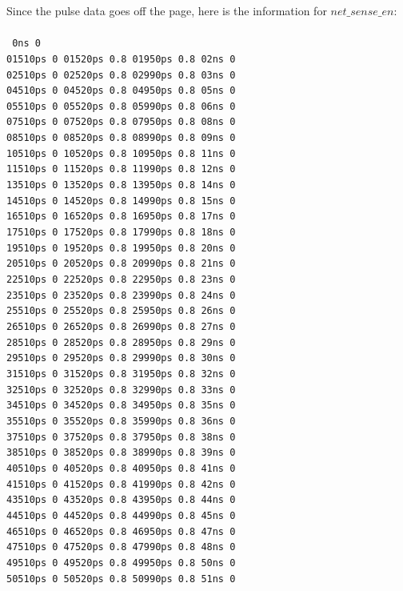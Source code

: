 \documentclass[a4paper]{article}
\def\code#1{\texttt{#1}}
\begin{document}
\newpage
Since the pulse data goes off the page, here is the information for $net\_sense\_en$:\\\\
\code {
0ns 0\\
01510ps 0 01520ps 0.8 01950ps 0.8 02ns 0\\
02510ps 0 02520ps 0.8 02990ps 0.8 03ns 0\\
04510ps 0 04520ps 0.8 04950ps 0.8 05ns 0\\
05510ps 0 05520ps 0.8 05990ps 0.8 06ns 0\\
07510ps 0 07520ps 0.8 07950ps 0.8 08ns 0\\
08510ps 0 08520ps 0.8 08990ps 0.8 09ns 0\\
10510ps 0 10520ps 0.8 10950ps 0.8 11ns 0\\
11510ps 0 11520ps 0.8 11990ps 0.8 12ns 0\\
13510ps 0 13520ps 0.8 13950ps 0.8 14ns 0\\
14510ps 0 14520ps 0.8 14990ps 0.8 15ns 0\\
16510ps 0 16520ps 0.8 16950ps 0.8 17ns 0\\
17510ps 0 17520ps 0.8 17990ps 0.8 18ns 0\\
19510ps 0 19520ps 0.8 19950ps 0.8 20ns 0\\
20510ps 0 20520ps 0.8 20990ps 0.8 21ns 0\\
22510ps 0 22520ps 0.8 22950ps 0.8 23ns 0\\
23510ps 0 23520ps 0.8 23990ps 0.8 24ns 0\\
25510ps 0 25520ps 0.8 25950ps 0.8 26ns 0\\
26510ps 0 26520ps 0.8 26990ps 0.8 27ns 0\\
28510ps 0 28520ps 0.8 28950ps 0.8 29ns 0\\
29510ps 0 29520ps 0.8 29990ps 0.8 30ns 0\\
31510ps 0 31520ps 0.8 31950ps 0.8 32ns 0\\
32510ps 0 32520ps 0.8 32990ps 0.8 33ns 0\\
34510ps 0 34520ps 0.8 34950ps 0.8 35ns 0\\
35510ps 0 35520ps 0.8 35990ps 0.8 36ns 0\\
37510ps 0 37520ps 0.8 37950ps 0.8 38ns 0\\
38510ps 0 38520ps 0.8 38990ps 0.8 39ns 0\\
40510ps 0 40520ps 0.8 40950ps 0.8 41ns 0\\
41510ps 0 41520ps 0.8 41990ps 0.8 42ns 0\\
43510ps 0 43520ps 0.8 43950ps 0.8 44ns 0\\
44510ps 0 44520ps 0.8 44990ps 0.8 45ns 0\\
46510ps 0 46520ps 0.8 46950ps 0.8 47ns 0\\
47510ps 0 47520ps 0.8 47990ps 0.8 48ns 0\\
49510ps 0 49520ps 0.8 49950ps 0.8 50ns 0\\
50510ps 0 50520ps 0.8 50990ps 0.8 51ns 0\\
}\\
\end{document}
